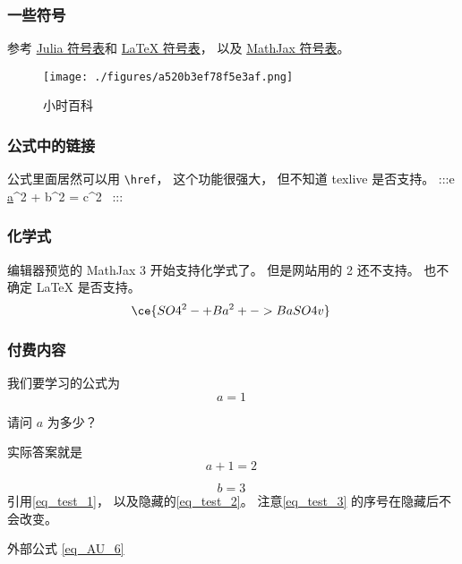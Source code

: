 
\subsubsection{一些符号}

参考 \href{https://docs.julialang.org/en/v1/manual/unicode-input/}{Julia 符号表}和 \href{https://oeis.org/wiki/List_of_LaTeX_mathematical_symbols}{LaTeX 符号表}， 以及 \href{http://www.onemathematicalcat.org/MathJaxDocumentation/TeXSyntax.htm}{MathJax 符号表}。

\begin{figure}[ht]
\centering
\texttt{[image: ./figures/a520b3ef78f5e3af.png]}
\caption{小时百科}\label{fig_test_1}
\end{figure}

\subsubsection{公式中的链接}
公式里面居然可以用 \verb`\href`， 这个功能很强大， 但不知道 texlive 是否支持。
:::e \href{https://wuli.wiki/online}{a}^2 + b^2 = c^2~
:::

\subsubsection{化学式}
编辑器预览的 MathJax 3 开始支持化学式了。 但是网站用的 2 还不支持。 也不确定 LaTeX 是否支持。
\begin{equation}
\ce{SO4^2- + Ba^2+ -> BaSO4 v}~
\end{equation}\subsubsection{付费内容}
我们要学习的公式为
\begin{equation}
\label{eq_test_1}
a = 1~
\end{equation}\begin{example}
{}
请问 $a$ 为多少？
\pay

实际答案就是
\begin{equation}
\label{eq_test_2}
a + 1 = 2~
\end{equation}\paid
\end{example}\begin{equation}
\label{eq_test_3}
b = 3~
\end{equation}引用\autoref{eq_test_1}， 以及隐藏的\autoref{eq_test_2}。 注意\autoref{eq_test_3} 的序号在隐藏后不会改变。

外部公式 \autoref{eq_AU_6} 

